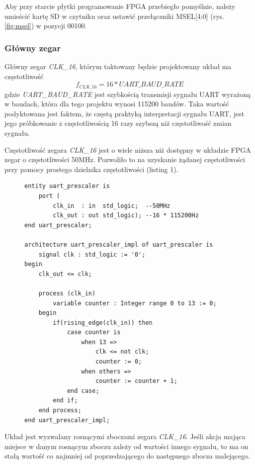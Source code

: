 Aby przy starcie płytki programowanie FPGA przebiegło pomyślnie, należy umieścić kartę SD w czytniku oraz ustawić przełączniki MSEL[4:0] (rys. \ref{fig:msel}) w pozycji 00100.

\subsubsection{Główny zegar}
\label{clk-16}
Główny zegar \textit{CLK\_16}, którym taktowany będzie projektowany układ ma częstotliwość
\begin{equation}
f_{CLK\_16} = 16 * UART\_BAUD\_RATE
\end{equation}
gdzie \textit{UART\_BAUD\_RATE} jest szybkością transmisji sygnału UART wyrażoną w baudach, która dla tego projektu wynosi 115200 baudów. Taka wartość podyktowana jest faktem, że częstą praktyką interpretacji sygnału UART, jest jego próbkowanie z częstotliwością 16 razy szybszą niż częstotliwość zmian sygnału.

Częstotliwość zegara \textit{CLK\_16} jest o wiele niższa niż dostępny w układzie FPGA zegar o częstotliwości 50MHz. Pozwoliło to na uzyskanie żądanej częstotliwości przy pomocy prostego dzielnika częstotliwości (listing 1).

\begin{figure}[!h]
\begin{lstlisting}[style=vhdl, caption={Dzielnik częstotliwości \textit{uart\_prescaler}}, captionpos=b]
entity uart_prescaler is
	port (
		clk_in  : in  std_logic;  --50MHz
		clk_out : out std_logic); --16 * 115200Hz
end uart_prescaler;

architecture uart_prescaler_impl of uart_prescaler is
	signal clk : std_logic := '0';
begin
	clk_out <= clk;
	
	process (clk_in) 
		variable counter : Integer range 0 to 13 := 0;
	begin	
		if(rising_edge(clk_in)) then
			case counter is
				when 13 =>
					clk <= not clk;
					counter := 0;
				when others =>
					counter := counter + 1;
			end case;
		end if;
	end process;
end uart_prescaler_impl;
\end{lstlisting}
\end{figure}

Układ jest wyzwalany rosnącymi zboczami zegara \textit{CLK\_16}. Jeśli akcja mająca miejsce w danym rosnącym zboczu zależy od wartości innego sygnału, to ma on stałą wartość co najmniej od poprzedzającego do następnego zbocza malejącego.

